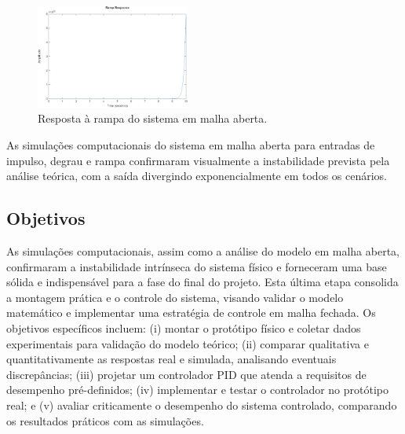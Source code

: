 \documentclass[9pt,a4paper,twocolumn,twoside]{tau-class/tau}
\begin{document}
\begin{figure}[H]
    \centering
    \includegraphics[width=0.45\textwidth]{figures/ramp_response.png}
    \caption{Resposta à rampa do sistema em malha aberta.}
    \label{fig:ramp}
\end{figure}

As simulações computacionais do sistema em malha aberta para entradas de impulso, degrau e rampa confirmaram visualmente a
instabilidade prevista pela análise teórica, com a saída divergindo exponencialmente em todos os cenários.

\subsection{Objetivos}
As simulações computacionais, assim como a análise do modelo em malha aberta, confirmaram a instabilidade intrínseca do sistema
físico e forneceram uma base sólida e indispensável para a fase do final do projeto. Esta última etapa consolida a
montagem prática e o controle do sistema, visando validar o modelo matemático e implementar uma estratégia de controle em malha
fechada. Os objetivos específicos incluem: (i) montar o protótipo físico e coletar dados experimentais para validação do modelo
teórico; (ii) comparar qualitativa e quantitativamente as respostas real e simulada, analisando eventuais discrepâncias;
(iii) projetar um controlador PID que atenda a requisitos de desempenho pré-definidos; (iv) implementar e testar o controlador
no protótipo real; e (v) avaliar criticamente o desempenho do sistema controlado, comparando os resultados práticos com as simulações.

\printbibliography

\end{document}
